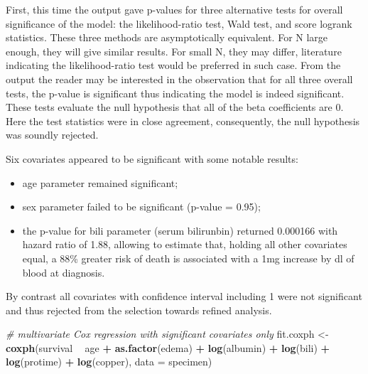 \documentclass[]{article}
\newenvironment{Shaded}{\begin{snugshade}}{\end{snugshade}}
\newcommand{\KeywordTok}[1]{\textcolor[rgb]{0.13,0.29,0.53}{\textbf{#1}}}
\newcommand{\DataTypeTok}[1]{\textcolor[rgb]{0.13,0.29,0.53}{#1}}
\newcommand{\StringTok}[1]{\textcolor[rgb]{0.31,0.60,0.02}{#1}}
\newcommand{\CommentTok}[1]{\textcolor[rgb]{0.56,0.35,0.01}{\textit{#1}}}
\newcommand{\OperatorTok}[1]{\textcolor[rgb]{0.81,0.36,0.00}{\textbf{#1}}}
\newcommand{\NormalTok}[1]{#1}
\providecommand{\tightlist}{%
  \setlength{\itemsep}{0pt}\setlength{\parskip}{0pt}}
\begin{document}
First, this time the output gave p-values for three alternative tests
for overall significance of the model: the likelihood-ratio test, Wald
test, and score logrank statistics. These three methods are
asymptotically equivalent. For N large enough, they will give similar
results. For small N, they may differ, literature indicating the
likelihood-ratio test would be preferred in such case. From the output
the reader may be interested in the observation that for all three
overall tests, the p-value is significant thus indicating the model is
indeed significant. These tests evaluate the null hypothesis that all of
the beta coefficients are 0. Here the test statistics were in close
agreement, consequently, the null hypothesis was soundly rejected.

Six covariates appeared to be significant with some notable results:

\begin{itemize}
\tightlist
\item
  age parameter remained significant;
\item
  sex parameter failed to be significant (p-value = 0.95);
\item
  the p-value for bili parameter (serum bilirunbin) returned 0.000166
  with hazard ratio of 1.88, allowing to estimate that, holding all
  other covariates equal, a 88\% greater risk of death is associated
  with a 1mg increase by dl of blood at diagnosis.
\end{itemize}

By contrast all covariates with confidence interval including 1 were not
significant and thus rejected from the selection towards refined
analysis.

\begin{Shaded}
\begin{Highlighting}[]
\CommentTok{# multivariate Cox regression with significant covariates only}
\NormalTok{fit.coxph <-}\StringTok{ }\KeywordTok{coxph}\NormalTok{(survival  }\OperatorTok{~}\StringTok{ }\NormalTok{age }\OperatorTok{+}\StringTok{ }\KeywordTok{as.factor}\NormalTok{(edema) }\OperatorTok{+}\StringTok{ }\KeywordTok{log}\NormalTok{(albumin) }\OperatorTok{+}\StringTok{ }\KeywordTok{log}\NormalTok{(bili)}
                   \OperatorTok{+}\StringTok{ }\KeywordTok{log}\NormalTok{(protime) }\OperatorTok{+}\StringTok{ }\KeywordTok{log}\NormalTok{(copper), }\DataTypeTok{data =}\NormalTok{ specimen)}
\end{Highlighting}
\end{Shaded}
\end{document}
